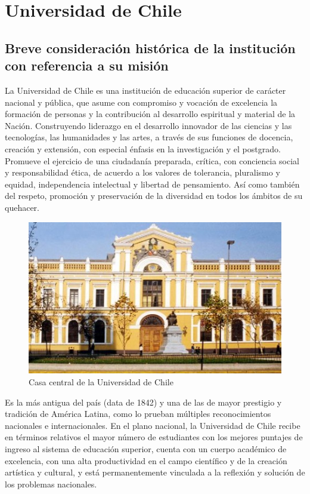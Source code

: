 \section{Universidad de Chile}

\subsection{Breve consideración histórica de la institución con referencia a su misión}
\label{historia}

La Universidad de Chile es una institución de educación superior de carácter nacional y pública,
que asume con compromiso y vocación de excelencia la formación de personas y la contribución
al desarrollo espiritual y material de la Nación. Construyendo liderazgo en el desarrollo innovador
de las ciencias y las tecnologías, las humanidades y las artes, a través de sus funciones de docencia,
creación y extensión, con especial énfasis en la investigación y el postgrado. Promueve el ejercicio
de una ciudadanía preparada, crítica, con conciencia social y responsabilidad ética, de acuerdo a los
valores de tolerancia, pluralismo y equidad, independencia intelectual y libertad de pensamiento.
Así como también del respeto, promoción y preservación de la diversidad en todos los ámbitos de
su quehacer.

\begin{figure}[ht!]
\centering
\includegraphics[width=\columnwidth]{./pictures/uchile.jpg}
\caption{Casa central de la Universidad de Chile}
\end{figure}

Es la más antigua del país (data de 1842) y una de las de mayor prestigio y tradición de América
Latina, como lo prueban múltiples reconocimientos nacionales e internacionales. En el plano
nacional, la Universidad de Chile recibe en términos relativos el mayor número de estudiantes con
los mejores puntajes de ingreso al sistema de educación superior, cuenta con un cuerpo académico
de excelencia, con una alta productividad en el campo científico y de la creación artística y cultural,
y está permanentemente vinculada a la reflexión y solución de los problemas nacionales.

